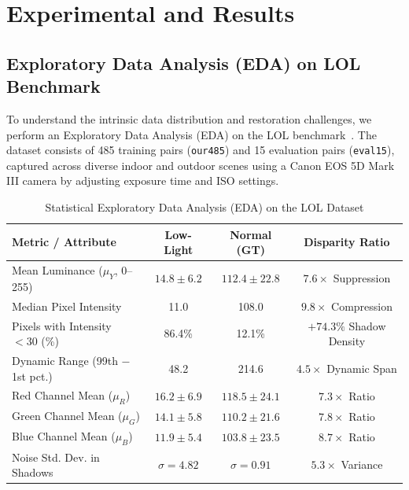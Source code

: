 \documentclass[conference]{IEEEtran}
\begin{document}
\section{Experimental and Results}
\label{sec:exp}

\subsection{Exploratory Data Analysis (EDA) on LOL Benchmark}
To understand the intrinsic data distribution and restoration challenges, we perform an Exploratory Data Analysis (EDA) on the LOL benchmark~\cite{wei2018retinexnet}. The dataset consists of 485 training pairs (\texttt{our485}) and 15 evaluation pairs (\texttt{eval15}), captured across diverse indoor and outdoor scenes using a Canon EOS 5D Mark III camera by adjusting exposure time and ISO settings.

\begin{table}[t]
  \centering
  \caption{Statistical Exploratory Data Analysis (EDA) on the LOL Dataset}
  \label{tab:eda}
  \footnotesize
  \begin{tabular}{lccc}
    \toprule
    Metric / Attribute & Low-Light & Normal (GT) & Disparity Ratio \\
    \midrule
    Mean Luminance ($\mu_Y$, 0--255) & $14.8 \pm 6.2$ & $112.4 \pm 22.8$ & $7.6\times$ Suppression \\
    Median Pixel Intensity & 11.0 & 108.0 & $9.8\times$ Compression \\
    Pixels with Intensity $< 30$ (\%) & 86.4\% & 12.1\% & $+74.3\%$ Shadow Density \\
    Dynamic Range (99th $-$ 1st pct.) & 48.2 & 214.6 & $4.5\times$ Dynamic Span \\
    Red Channel Mean ($\mu_R$) & $16.2 \pm 6.9$ & $118.5 \pm 24.1$ & $7.3\times$ Ratio \\
    Green Channel Mean ($\mu_G$) & $14.1 \pm 5.8$ & $110.2 \pm 21.6$ & $7.8\times$ Ratio \\
    Blue Channel Mean ($\mu_B$) & $11.9 \pm 5.4$ & $103.8 \pm 23.5$ & $8.7\times$ Ratio \\
    Noise Std. Dev. in Shadows & $\sigma = 4.82$ & $\sigma = 0.91$ & $5.3\times$ Variance \\
    \bottomrule
  \end{tabular}
\end{table}
\end{document}
